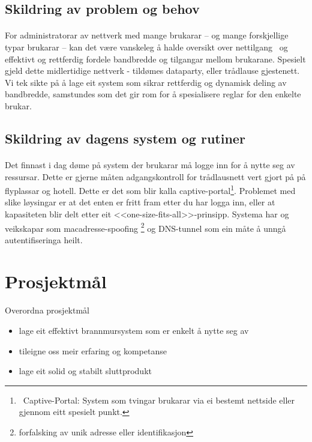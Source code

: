 \documentclass[nynorsk,12pt,a4paper]{article}
\begin{document}
\subsection{Skildring av problem og behov}
\paragraph{}
For administratorar av nettverk med mange brukarar -- og mange forskjellige typar brukarar -- kan det være vanskeleg å halde oversikt over nettilgang \ og effektivt og rettferdig fordele bandbredde og tilgangar mellom brukarane. Spesielt gjeld dette midlertidige nettverk - tildømes dataparty, eller trådlause gjestenett. Vi tek sikte på å lage eit system som sikrar rettferdig og dynamisk deling av bandbredde, samstundes som det gir rom for å spesialisere reglar for den enkelte brukar. 

\subsection{Skildring av dagens system og rutiner}
\paragraph{}
Det finnast i dag døme på system der brukarar må logge inn for å nytte seg av ressursar. Dette er gjerne måten adgangskontroll for trådlausnett vert gjort på på flyplassar og hotell. Dette er det som blir kalla captive-portal\footnote{\ Captive{}-Portal: System som tvingar brukarar via ei bestemt nettside eller gjennom eitt spesielt punkt. }. Problemet med slike løysingar er at det enten er fritt fram etter du har logga inn, eller at kapasiteten blir delt etter eit <<one-size-fits-all>>-prinsipp. Systema har og veikskapar som macadresse-spoofing \footnote{forfalsking av unik  adresse eller identifikasjon} og DNS-tunnel som ein måte å unngå autentifiseringa heilt.

\newpage
\section{Prosjektmål}
\paragraph{}
Overordna prosjektmål
\begin{itemize}
	\item lage eit effektivt brannmursystem som er enkelt å nytte seg av
	\item tileigne oss meir erfaring og kompetanse
	\item lage eit solid og stabilt sluttprodukt
\end{itemize}
\end{document}
